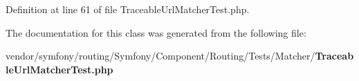 Definition at line 61 of file Traceable\+Url\+Matcher\+Test.\+php.



The documentation for this class was generated from the following file\+:\begin{DoxyCompactItemize}
\item 
vendor/symfony/routing/\+Symfony/\+Component/\+Routing/\+Tests/\+Matcher/{\bf Traceable\+Url\+Matcher\+Test.\+php}\end{DoxyCompactItemize}

